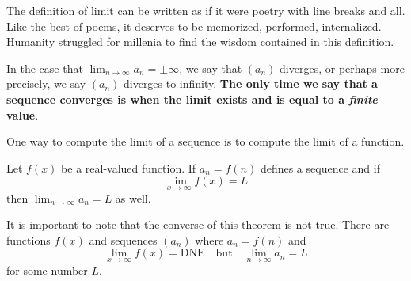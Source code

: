 \documentclass{ximera}
\begin{document}
\begin{question}
    \begin{multipleChoice}
    \end{multipleChoice}
    

  The definition of limit can be written as if it were poetry with
  line breaks and all.  Like the best of poems, it deserves to be
  memorized, performed, internalized.  Humanity struggled for millenia
  to find the wisdom contained in this definition.
\end{question}

\begin{warning}
  In the case that $\lim_{n \to \infty} a_n = \pm\infty$, we say that
  $(a_n)$ diverges, or perhaps more precisely, we say $(a_n)$ diverges
  to infinity.  \textbf{The only time we say that a sequence converges
    is when the limit exists and is equal to a \textit{finite} value}.
\end{warning}


One way to compute the limit of a sequence is to compute the limit of
a function.
\begin{theorem}
  Let $f(x)$ be a real-valued function.  If $a_n = f(n)$ defines a
  sequence and if
  \[
  \lim_{x\to\infty}f(x)=L
  \]
  then $\lim_{n\to\infty} a_n=L$ as well.
\end{theorem}

\begin{warning}
It is important to note that the converse of this theorem is not
true. There are functions $f(x)$ and sequences $(a_n)$ where $a_n
=f(n)$ and
\[
\lim_{x\to\infty}f(x)=\text{DNE} \quad\text{but} \quad \lim_{n\to\infty} a_n = L
\]
for some number $L$.
\end{warning}
\end{document}
